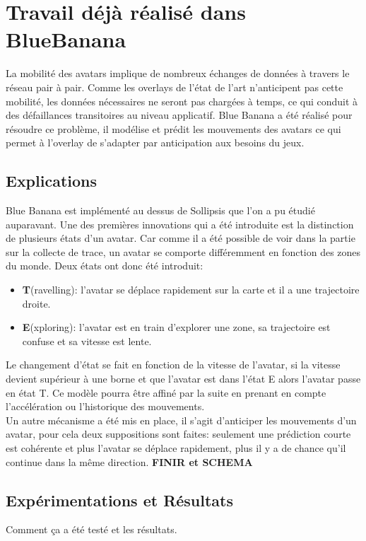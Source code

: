 \section{Travail déjà réalisé dans BlueBanana}
	\label{BlueBanana}
	La mobilité des avatars implique de nombreux échanges de données à travers le réseau pair à pair. Comme les overlays de l'état de l'art n'anticipent pas cette mobilité, les données nécessaires ne seront pas chargées à temps, ce qui conduit à des défaillances transitoires au niveau applicatif. Blue Banana a été réalisé pour résoudre ce problème, il modélise et prédit les mouvements des avatars ce qui permet à l'overlay de s'adapter par anticipation aux besoins du jeux.
	\subsection{Explications}
	Blue Banana est implémenté au dessus de Sollipsis que l'on a pu étudié auparavant. Une des premières innovations qui a été introduite est la distinction de plusieurs états d'un avatar. Car comme il a été possible de voir dans la partie sur la collecte de trace, un avatar se comporte différemment en fonction des zones du monde. Deux états ont donc été introduit:
	\begin{itemize}
		\item \textbf{T}(ravelling): l'avatar se déplace rapidement sur la carte et il a une trajectoire droite.  
		\item \textbf{E}(xploring): l'avatar est en train d'explorer une zone, sa trajectoire est confuse et sa vitesse est lente.
	\end{itemize} 
	Le changement d'état se fait en fonction de la vitesse de l'avatar, si la vitesse devient supérieur à une borne et que l'avatar est dans l'état E alors l'avatar passe en état T. Ce modèle pourra être affiné par la suite en prenant en compte l'accélération ou l'historique des mouvements. \\
	Un autre mécanisme a été mis en place, il s'agit d'anticiper les mouvements d'un avatar, pour cela deux suppositions sont faites: seulement une prédiction courte est cohérente et plus l'avatar se déplace rapidement, plus il y a de chance qu'il continue dans la même direction. \textbf{FINIR et SCHEMA}  	
	\subsection{Expérimentations et Résultats}
		Comment ça a été testé et les résultats.
